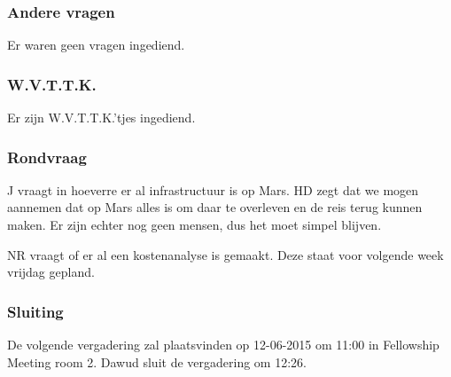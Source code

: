 \subsubsection{Andere vragen}
Er waren geen vragen ingediend.

\subsubsection{W.V.T.T.K.}
Er zijn W.V.T.T.K.'tjes ingediend.

\subsubsection{Rondvraag}
J vraagt in hoeverre er al infrastructuur is op Mars. HD zegt dat we mogen aannemen dat op Mars alles is om daar te overleven en de reis terug kunnen maken. Er zijn echter nog geen mensen, dus het moet simpel blijven.

NR vraagt of er al een kostenanalyse is gemaakt. Deze staat voor volgende week vrijdag gepland.

\subsubsection{Sluiting}
De volgende vergadering zal plaatsvinden op 12-06-2015 om 11:00 in Fellowship Meeting room 2.
\newline\newline
Dawud sluit de vergadering om 12:26.